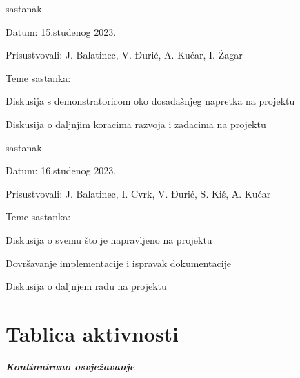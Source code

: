 \begin{packed_enum}
			\item  sastanak
			
			\item[] \begin{packed_item}
				\item Datum: 15.studenog 2023.
				\item Prisustvovali: J. Balatinec, V. Đurić, A. Kućar, I. Žagar
				\item Teme sastanka:
				\begin{packed_item}
					\item  Diskusija s demonstratoricom oko dosadašnjeg napretka na projektu
					\item  Diskusija o daljnjim koracima razvoja i zadacima na projektu
				\end{packed_item}
			\end{packed_item}
			
			\item  sastanak
			
			\item[] \begin{packed_item}
				\item Datum: 16.studenog 2023.
				\item Prisustvovali: J. Balatinec, I. Cvrk, V. Đurić, S. Kiš, A. Kućar
				\item Teme sastanka:
				\begin{packed_item}
					\item  Diskusija o svemu što je napravljeno na projektu
					\item  Dovršavanje implementacije i ispravak dokumentacije
					\item  Diskusija o daljnjem radu na projektu
				\end{packed_item}
			\end{packed_item}
			
			
		\end{packed_enum}
		
		\eject
		\section*{Tablica aktivnosti}
		
			\textbf{\textit{Kontinuirano osvježavanje}}\\
			

